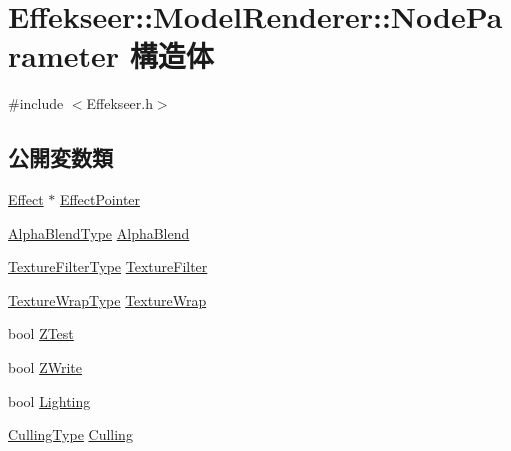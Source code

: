 \hypertarget{struct_effekseer_1_1_model_renderer_1_1_node_parameter}{}\section{Effekseer\+:\+:Model\+Renderer\+:\+:Node\+Parameter 構造体}
\label{struct_effekseer_1_1_model_renderer_1_1_node_parameter}


{\ttfamily \#include $<$Effekseer.\+h$>$}

\subsection*{公開変数類}
\begin{DoxyCompactItemize}
\item 
\mbox{\hyperlink{class_effekseer_1_1_effect}{Effect}} $\ast$ \mbox{\hyperlink{struct_effekseer_1_1_model_renderer_1_1_node_parameter_a593a1a84d97fde65b420b0688182184c}{Effect\+Pointer}}
\item 
\mbox{\hyperlink{namespace_effekseer_a8c32fd5b7ec7feed73314b2ae8086949}{Alpha\+Blend\+Type}} \mbox{\hyperlink{struct_effekseer_1_1_model_renderer_1_1_node_parameter_a412adbcede66578e67fc52338df61843}{Alpha\+Blend}}
\item 
\mbox{\hyperlink{namespace_effekseer_ae3518502cfcb4ec4991f13c0b3e4c6ee}{Texture\+Filter\+Type}} \mbox{\hyperlink{struct_effekseer_1_1_model_renderer_1_1_node_parameter_ab5153c949b1fa4a5a176c3930cf556d0}{Texture\+Filter}}
\item 
\mbox{\hyperlink{namespace_effekseer_a5320c83784602974b6278bf1a77b58a3}{Texture\+Wrap\+Type}} \mbox{\hyperlink{struct_effekseer_1_1_model_renderer_1_1_node_parameter_a1c746c0a2a09cc5e61b5b18faf9e90b4}{Texture\+Wrap}}
\item 
bool \mbox{\hyperlink{struct_effekseer_1_1_model_renderer_1_1_node_parameter_a1618ec9d6054c1ab4e7ae3d6aba0c1ea}{Z\+Test}}
\item 
bool \mbox{\hyperlink{struct_effekseer_1_1_model_renderer_1_1_node_parameter_ad7dee83188011c4dea4313ef0cf21570}{Z\+Write}}
\item 
bool \mbox{\hyperlink{struct_effekseer_1_1_model_renderer_1_1_node_parameter_ac7b1135e681dd89d17686dbf275ad856}{Lighting}}
\item 
\mbox{\hyperlink{namespace_effekseer_a3ae9542a9c9309ec191be1ae5e6dc00a}{Culling\+Type}} \mbox{\hyperlink{struct_effekseer_1_1_model_renderer_1_1_node_parameter_a8ead63177a2cb7f0797f646e682db538}{Culling}}

\end{DoxyCompactItemize}
